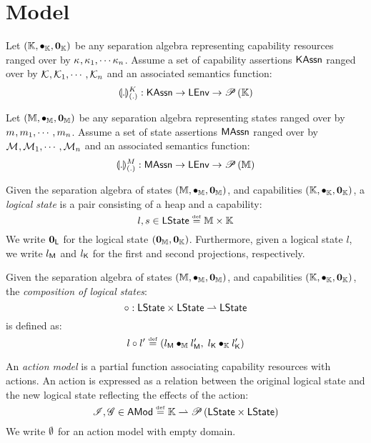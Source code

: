 \section*{Model}
\begin{parameter}
Let $\left(\Caps, \composeCap, \unitCap\right)$ be any separation algebra representing capability resources ranged over by $\ca{}, \ca{1}, \cdots  \ca{n}$. Assume a set of capability assertions $\KAssertions$ ranged over by $\capAss{}, \capAss{1}, \cdots, \capAss{n}$ and an associated semantics function:
%
\[
	\semK[\blankArg]{.} : \KAssertions \rightarrow \LEnv \rightarrow \pset{\Caps}
\]
%
\end{parameter}
%
%
\begin{parameter}
Let $(\Heaps, \composeH, \unitH)$ be any separation algebra representing states ranged over by $\h{}, \h{1}, \cdots, \h{n}$. Assume a set of state assertions $\HAssertions$ ranged over by $\heapAss{}, \heapAss{1}, \cdots, \heapAss{n}$ and an associated semantics function:
%
\[
	\semH[\blankArg]{.} : \HAssertions \rightarrow \LEnv \rightarrow \pset{\Heaps}
\]
%
\end{parameter}
%
%
\begin{definition}
Given the separation algebra of states $(\Heaps, \composeH, \unitH)$, and capabilities $\left(\Caps, \composeCap, \unitCap\right)$, a \emph{logical state} is a pair consisting of a heap and a capability:
%
\[
	l, s \in \LStates \eqdef \Heaps \times \Caps
\]
%
We write $\unitL$ for the logical state $(\unitH, \unitCap)$. Furthermore, given a logical state $l$, we write $\heapPart{l}$ and $\capPart{l}$ for the first and second projections, respectively.
\end{definition}
%
%
\begin{definition}
Given the separation algebra of states $(\Heaps, \composeH, \unitH)$, and capabilities $\left(\Caps, \composeCap, \unitCap\right)$, the \emph{composition of logical states}:
%
\[
	\composeL : \LStates \times \LStates \rightharpoonup \LStates
\]
%
is defined as:
%
\[
	l \composeL l' \eqdef (\heapPart{l} \composeH \heapPart{l'},\; \capPart{l} \composeCap \capPart{l'})
\]
%
\end{definition}
%
%
\begin{definition}
An \emph{action model} is a partial function associating capability resources with actions. An action is expressed as a relation between the original logical state and the new logical state reflecting the effects of the action:
%
\[
	\lmod, \gmod \in \AMods \eqdef \Caps \rightharpoonup \pset{\LStates \times \LStates}
\]
%
We write $\unitAM$ for an action model with empty domain.
\end{definition}
